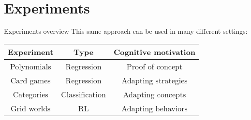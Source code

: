 \documentclass{beamer}
\begin{document}
\section{Experiments}

\begin{frame}{Experiments overview}
This same approach can be used in many different settings: 
\begin{table}
\center
\begin{tabular}{|c|c|c|}
\hline
Experiment & Type & Cognitive motivation \\
\hline
Polynomials & Regression & Proof of concept \\
Card games & Regression & Adapting strategies \\
Categories & Classification & Adapting concepts \\
Grid worlds & RL & Adapting behaviors \\
\hline
\end{tabular}
\end{table}
\end{frame}
\end{document}
